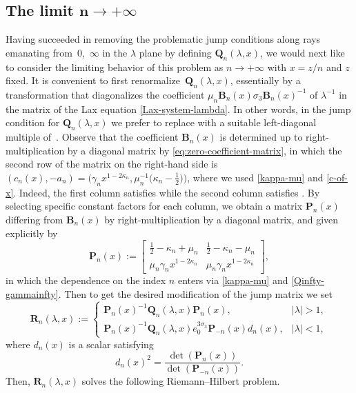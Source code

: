 \subsection[The limit n to infinity]{The limit $\boldsymbol{n\to+\infty}$}
Having succeeded in removing the problematic jump conditions along rays emanating from~$0$,~$\infty$ in the $\lambda$ plane by defining $\mathbf{Q}_n(\lambda,x)$, we would next like to consider the limiting behavior of this problem as $n\to+\infty$ with $x=z/n$ and $z$ fixed. It is convenient to first renormalize~$\mathbf{Q}_n(\lambda,x)$, essentially by a transformation that diagonalizes the coefficient $\mu_n \mathbf{B}_n(x)\sigma_3\mathbf{B}_n(x)^{-1}$ of $\lambda^{-1}$ in the matrix of the Lax equation \eqref{Lax-system-lambda}.
In other words, in the jump condition for $\mathbf{Q}_n(\lambda,x)$ we prefer to replace  with a suitable left-diagonal multiple of~. Observe that the coefficient $\mathbf{B}_n(x)$ is determined up to right-multiplication by a diagonal matrix by
\eqref{eq:zero-coefficient-matrix}, in which the second row of the matrix on the right-hand side is $(c_n(x),-a_n)=\big(\gamma_n x^{1-2\kappa_n},\mu_n ^{-1}\big(\kappa_n-\frac{1}{2}\big)\big)$, where we used \eqref{kappa-mu} and \eqref{c-of-x}. Indeed, the first column  satisfies  while the second column  satisfies . By selecting specific constant factors for each column, we obtain a matrix $\mathbf{P}_n(x)$ differing from $\mathbf{B}_n(x)$ by right-multiplication by a diagonal matrix, and given explicitly by
\begin{equation*}
 \mathbf{P}_n(x):=\begin{bmatrix}\frac{1}{2}-\kappa_n+\mu_n & \frac{1}{2}-\kappa_n-\mu_n \\
 \mu_n \gamma_n x^{1-2\kappa_n} & \mu_n \gamma_n x^{1-2\kappa_n}\end{bmatrix},
\end{equation*}
in which the dependence on the index $n$ enters via \eqref{kappa-mu} and \eqref{Qinfty-gammainfty}. Then to get the desired modification of the jump matrix we set
\begin{equation*}
 \mathbf{R}_n(\lambda,x):=\begin{cases}
 \mathbf{P}_n(x)^{-1}\mathbf{Q}_n(\lambda,x)\mathbf{P}_n(x),& |\lambda|>1,\\
 \mathbf{P}_n(x)^{-1}\mathbf{Q}_n(\lambda,x)e_0^{3\sigma_3}\mathbf{P}_{-n}(x)d_n(x),& |\lambda|<1,
 \end{cases}
\end{equation*}
where $d_n(x)$ is a scalar satisfying
\begin{equation}
 d_n(x)^2 = \frac{\det(\mathbf{P}_{n}(x))}{\det(\mathbf{P}_{-n}(x))}.
 \label{eq:dn-squared}
\end{equation}
Then, $\mathbf{R}_n(\lambda,x)$ solves the following
Riemann--Hilbert problem.

